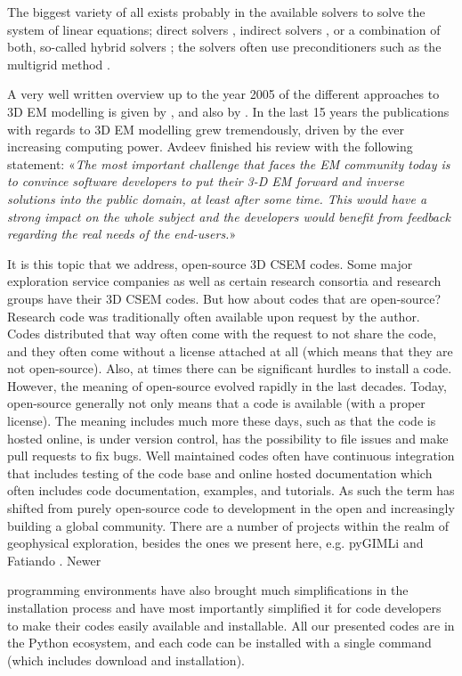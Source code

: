 \documentclass[
    paper,
  ]{geophysics}
\newcommand{\mycom}[2][]{
  \todo[color=yellow]{\textbf{\uppercase{[#1]}}:~#2}}
\begin{document}
The biggest variety of all exists probably in the available solvers to solve
the system of linear equations; direct solvers \citep{GEO.09.Streich,
GEO.15.Grayver, GP.14.Chung, GEO.14.Jaysaval, SEG.15.Oh, GJI.18.Wang}, indirect
solvers \citep{GP.06.Mulder, GJI.15.Jaysaval}, or a combination of both,
so-called hybrid solvers \citep{GEO.18.Liu}; the solvers often use
preconditioners such as the multigrid method \citep{SIAM.02.Aruliah,
GP.06.Mulder, GJI.16.Jaysaval}.

A very well written overview up to the year 2005 of the different approaches to
3D EM modelling is given by \cite{SG.05.Avdeev}, and also by
\cite{SG.10.Borner}. In the last 15 years the publications with regards to 3D
EM  modelling grew tremendously, driven by the ever increasing computing power.
Avdeev finished his review with the following statement: «\emph{The most
important challenge that faces the EM community today is to convince software
developers to put their 3-D EM forward and inverse solutions into the public
domain, at least after some time. This would have a strong impact on the whole
subject and the developers would benefit from feedback regarding the real needs
of the end-users.}»

It is this topic that we address, open-source 3D CSEM codes. Some major
exploration service companies as well as certain research consortia and
research groups have their 3D CSEM codes. But how about codes that are
open-source? Research code was traditionally often available upon request by
the author. Codes distributed that way often come with the request to not share
the code, and they often come without a license attached at all (which means
that they are not open-source). Also, at times there can be significant hurdles
to install a code. However, the meaning of open-source evolved rapidly in the
last decades. Today, open-source generally not only means that a code is
available (with a proper license). The meaning includes much more these days,
such as that the code is hosted online, is under version control, has the
possibility to file issues and make pull requests to fix bugs. Well maintained
codes often have continuous integration that includes testing of the code base
and online hosted documentation which often includes code documentation,
examples, and tutorials. As such the term has shifted from purely open-source
code to development in the open and increasingly building a global community.
There are a number of projects within the realm of geophysical exploration,
besides the ones we present here, \mycom[DW]{Others coming to your mind?}e.g.
pyGIMLi \citep{CAG.17.Rucker} and Fatiando \citep{JOSS.18.Uieda}. Newer
\mycom[DW]{wrong term, think about it}programming environments  have also
brought much simplifications in the installation process and have most
importantly simplified it for code developers to make their codes easily
available and installable. All our presented codes are in the Python ecosystem,
and each code can be installed with a single command (which includes download
and installation).
\end{document}

